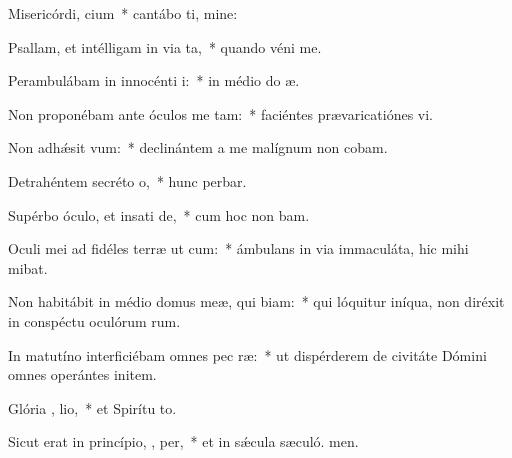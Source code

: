 \item Misericórdi,  cium~* cantábo ti, mine:
\item Psallam, et intélligam in via ta,~* quando véni  me.
\item Perambulábam in innocénti  i:~* in médio do æ.
\item Non proponébam ante óculos me  tam:~* faciéntes prævaricatiónes vi.
\item Non adhǽsit   vum:~* declinántem a me malígnum non cobam.
\item Detrahéntem secréto  o,~* hunc perbar.
\item Supérbo óculo, et insati de,~* cum hoc non bam.
\item Oculi mei ad fidéles terræ ut  cum:~* ámbulans in via immaculáta, hic mihi mibat.
\item Non habitábit in médio domus meæ, qui  biam:~* qui lóquitur iníqua, non diréxit in conspéctu oculórum rum.
\item In matutíno interficiébam omnes pec ræ:~* ut dispérderem de civitáte Dómini omnes operántes initem.
\item Glória ,  lio,~* et Spirítu to.
\item Sicut erat in princípio,  ,  per,~* et in sǽcula sæculó. men.
